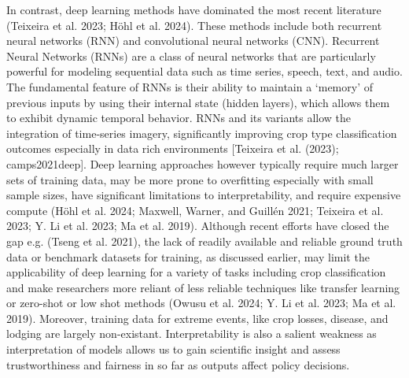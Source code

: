 \documentclass[
  journal,
  twocolumn]{IEEEtran}
\begin{document}
In contrast, deep learning methods have dominated the most recent
literature (Teixeira et al. 2023; Höhl et al. 2024). These methods
include both recurrent neural networks (RNN) and convolutional neural
networks (CNN). Recurrent Neural Networks (RNNs) are a class of neural
networks that are particularly powerful for modeling sequential data
such as time series, speech, text, and audio. The fundamental feature of
RNNs is their ability to maintain a `memory' of previous inputs by using
their internal state (hidden layers), which allows them to exhibit
dynamic temporal behavior. RNNs and its variants allow the integration
of time-series imagery, significantly improving crop type classification
outcomes especially in data rich environments {[}Teixeira et al. (2023);
camps2021deep{]}. Deep learning approaches however typically require
much larger sets of training data, may be more prone to overfitting
especially with small sample sizes, have significant limitations to
interpretability, and require expensive compute (Höhl et al. 2024;
Maxwell, Warner, and Guillén 2021; Teixeira et al. 2023; Y. Li et al.
2023; Ma et al. 2019). Although recent efforts have closed the gap e.g.
(Tseng et al. 2021), the lack of readily available and reliable ground
truth data or benchmark datasets for training, as discussed earlier, may
limit the applicability of deep learning for a variety of tasks
including crop classification and make researchers more reliant of less
reliable techniques like transfer learning or zero-shot or low shot
methods (Owusu et al. 2024; Y. Li et al. 2023; Ma et al. 2019).
Moreover, training data for extreme events, like crop losses, disease,
and lodging are largely non-existant. Interpretability is also a salient
weakness as interpretation of models allows us to gain scientific
insight and assess trustworthiness and fairness in so far as outputs
affect policy decisions.
\end{document}
